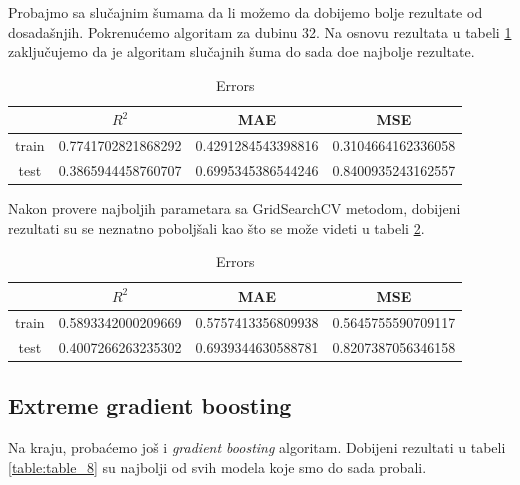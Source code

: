 \documentclass[a4paper]{article}
\begin{document}
Probajmo sa slučajnim šumama da li možemo da dobijemo bolje rezultate od dosadašnjih. Pokrenućemo algoritam za dubinu 32. Na osnovu rezultata u tabeli \ref{table:table_6} zaključujemo da je algoritam slučajnih šuma do sada doe najbolje rezultate.

\begin{table}[h!]
\caption{Errors}
\centering %
\begin{tabular}{c c c c} %
\hline\hline %
 & ${R}^2$ & MAE & MSE \\ [0.2ex] %
\hline %
train & 0.7741702821868292 & 0.4291284543398816 & 0.3104664162336058 \\ %
test & 0.3865944458760707 & 0.6995345386544246 & 0.8400935243162557 \\ [1ex] %
\end{tabular}
\label{table:table_6}
\end{table}

Nakon provere najboljih parametara sa GridSearchCV metodom, dobijeni rezultati su se neznatno poboljšali kao što se može videti u tabeli \ref{table:table_7}.

\begin{table}[h!]
\caption{Errors}
\centering %
\begin{tabular}{c c c c} %
\hline\hline %
 & ${R}^2$ & MAE & MSE \\ [0.2ex] %
\hline %
train & 0.5893342000209669 & 0.5757413356809938 & 0.5645755590709117 \\ %
test & 0.4007266263235302 & 0.6939344630588781 & 0.8207387056346158 \\ [1ex] %
\end{tabular}
\label{table:table_7}
\end{table}

\subsection{Extreme gradient boosting}
\label{sec:xgBoost_1}

Na kraju, probaćemo još i \textit{gradient boosting} algoritam. Dobijeni rezultati u tabeli \ref{table:table_8} su najbolji od svih modela koje smo do sada probali.
\end{document}
